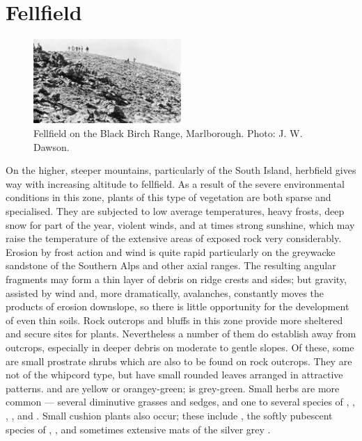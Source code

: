 \section{Fellfield}

\begin{figure}
	\includegraphics[width=0.5\textwidth]{graphics/figure105fellfield.jpg}
	\centering
	\caption[Fellfield on the Black Birch Range]{Fellfield on the Black Birch Range, Marlborough.
	Photo: J. W. Dawson.}
	\label{fig:105fellfield}
\end{figure}

On the higher, steeper mountains, particularly of the South Island, herbfield gives way with increasing altitude to fellfield.
As a result of the severe environmental conditions in this zone, plants of this type of vegetation are both sparse and specialised.
They are subjected to low average temperatures, heavy frosts, deep snow for part of the year, violent winds, and at times strong sunshine, which may raise the temperature of the extensive areas of exposed rock very considerably.
Erosion by frost action and wind is quite rapid particularly on the greywacke sandstone of the Southern Alps and other axial ranges.
The resulting angular fragments may form a thin layer of debris on ridge crests and sides; but gravity, assisted by wind and, more dramatically, avalanches, constantly moves the products of erosion downslope, so there is little opportunity for the development of even thin soils.
Rock outcrops and bluffs in this zone provide more sheltered and secure sites for plants.
Nevertheless a number of them do establish away from outcrops, especially in deeper debris on moderate to gentle slopes.
Of these, some are small prostrate  shrubs which are also to be found on rock outcrops.
They are not of the whipcord type, but have small rounded leaves arranged in attractive patterns.  and  are yellow or orangey-green;  is grey-green.
Small herbs are more common — several diminutive grasses and sedges, and one to several species of , , , ,  and .
Small cushion plants also occur; these include , the softly pubescent species of , , and sometimes extensive mats of the silver grey .

